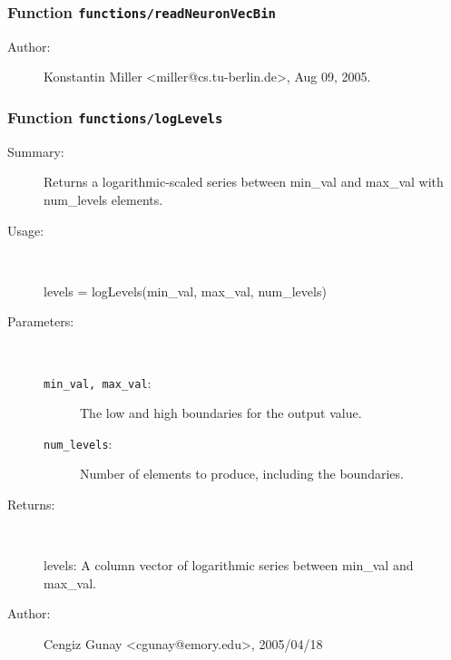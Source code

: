 \subsubsection[Function \texttt{readNeuronVecBin}]{Function \texttt{functions/readNeuronVecBin}}%
%
\label{ref_functions__readNeuronVecBin}%
\hypertarget{ref_functions__readNeuronVecBin}{}%
\begin{description}
%
%
%
%
%
%
%
\item[Author:]%
Konstantin Miller <miller@cs.tu-berlin.de>, Aug 09, 2005.%
\end{description}
\methodline%
\subsubsection[Function \texttt{logLevels}]{Function \texttt{functions/logLevels}}%
%
\label{ref_functions__logLevels}%
\hypertarget{ref_functions__logLevels}{}%
\begin{description}
\item[Summary:]Returns a logarithmic-scaled series between min\_val and max\_val with num\_levels elements.
%
\item[Usage:]~%
\begin{lyxcode}%
levels = logLevels(min\_val, max\_val, num\_levels)
%
\end{lyxcode}%
%
%
\item[Parameters:]~
\begin{description}%
\item[\texttt{min\_val, max\_val}:]
 The low and high boundaries for the output value.
\item[\texttt{num\_levels}:]
 Number of elements to produce, including the boundaries.
\end{description}%
%
\item[Returns:]~

 	levels: A column vector of logarithmic series between min\_val and max\_val.
%
%
%
\item[Author:]%
Cengiz Gunay <cgunay@emory.edu>, 2005/04/18%
\end{description}
\methodline%
